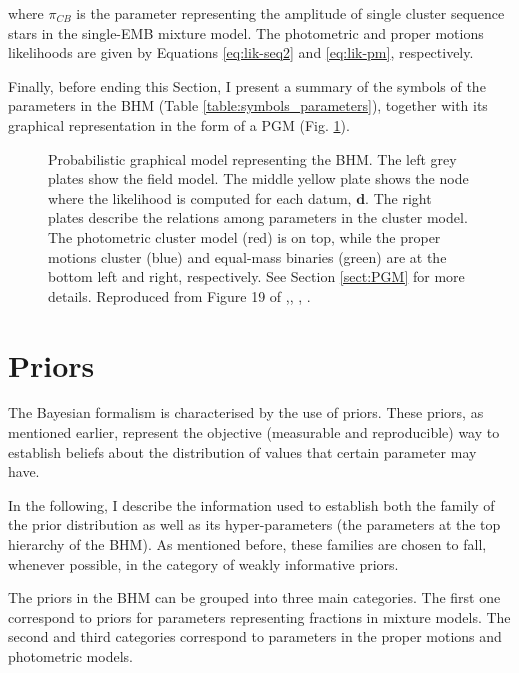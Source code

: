 where $\pi_{CB}$ is the parameter representing the amplitude of single cluster sequence stars in the single-EMB mixture model. The photometric and proper motions likelihoods are given by Equations \ref{eq:lik-seq2} and \ref{eq:lik-pm}, respectively.

Finally, before ending this Section, I present a summary of the symbols of the parameters in the BHM (Table \ref{table:symbols_parameters}), together with its graphical representation in the form of a PGM (Fig. \ref{fig:PGMBHM}).



\begin{figure}[ht!]
  \begin{center}
  \resizebox{\textwidth}{!}{}
  \end{center}
  \caption{Probabilistic graphical model representing the BHM. The left grey plates show the field model. The middle yellow plate shows the node where the likelihood is computed for each datum, $\boldsymbol{d}$. The right plates describe the relations among parameters in the cluster model. The photometric cluster model (red) is on top, while the proper motions cluster (blue) and equal-mass binaries (green) are at the bottom left and right, respectively. See Section \ref{sect:PGM} for more details. Reproduced from Figure 19 of \citet{Olivares2017},\textit{}, , .}
  \label{fig:PGMBHM}
\end{figure}
 
\section{Priors}
\label{sect:priors}
The Bayesian formalism is characterised by the use of priors. These priors, as mentioned earlier, represent the objective (measurable and reproducible) way to establish beliefs about the distribution of values that certain parameter may have. 

In the following, I describe the information used to establish both the family of the prior distribution as well as its hyper-parameters (the parameters at the top hierarchy of the BHM). As mentioned before, these families are chosen to fall, whenever possible, in the category of weakly informative priors. 

The priors in the BHM can be grouped into three main categories. The first one correspond to priors for parameters representing fractions in mixture models. The second and third categories correspond to parameters in the proper motions and photometric models. 

